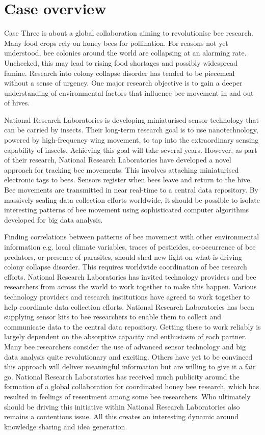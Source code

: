 
\section{Case overview}

Case Three is about a global collaboration aiming to revolutionise bee research. Many food crops rely on honey bees for pollination. For reasons not yet understood, bee colonies around the world are collapsing at an alarming rate. Unchecked, this may lead to rising food shortages and possibly widespread famine. Research into colony collapse disorder has tended to be piecemeal without a sense of urgency. One major research objective is to gain a deeper understanding of environmental factors that influence bee movement in and out of hives. \medskip

National Research Laboratories is developing miniaturised sensor technology that can be carried by insects. Their long-term research goal is to use nanotechnology, powered by high-frequency wing movement, to tap into the extraordinary sensing capability of insects. Achieving this goal will take several years. However, as part of their research, National Research Laboratories have developed a novel approach for tracking bee movements. This involves attaching miniaturised electronic tags to bees. Sensors register when bees leave and return to the hive. Bee movements are transmitted in near real-time to a central data repository. By massively scaling data collection efforts worldwide, it should be possible to isolate interesting patterns of bee movement using sophisticated computer algorithms developed for big data analysis.\medskip

Finding correlations between patterns of bee movement with other environmental information e.g. local climate variables, traces of pesticides, co-occurrence of bee predators, or presence of parasites, should shed new light on what is driving colony collapse disorder. This requires worldwide coordination of bee research efforts. National Research Laboratories has invited technology providers and bee researchers from across the world to work together to make this happen. Various technology providers and research institutions have agreed to work together to help coordinate data collection efforts. National Research Laboratories has been supplying sensor kits to bee researchers to enable them to collect and communicate data to the central data repository. Getting these to work reliably is largely dependent on the absorptive capacity and enthusiasm of each partner. Many bee researchers consider the use of advanced sensor technology and big data analysis quite revolutionary and exciting. Others have yet to be convinced this approach will deliver meaningful information but are willing to give it a fair go. National Research Laboratories has received much publicity around the formation of a global collaboration for coordinated honey bee research, which has resulted in feelings of resentment among some bee researchers. Who ultimately should be driving this initiative within National Research Laboratories also remains a contentious issue. All this creates an interesting dynamic around knowledge sharing and idea generation. \medskip

